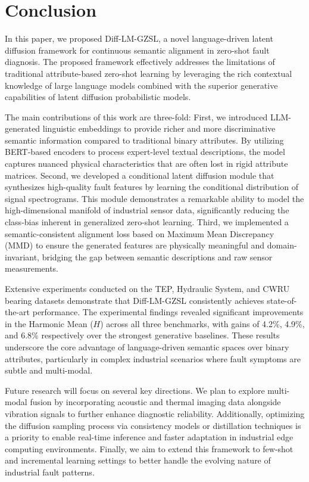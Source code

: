 \section{Conclusion}
In this paper, we proposed Diff-LM-GZSL, a novel language-driven latent diffusion framework for continuous semantic alignment in zero-shot fault diagnosis. The proposed framework effectively addresses the limitations of traditional attribute-based zero-shot learning by leveraging the rich contextual knowledge of large language models combined with the superior generative capabilities of latent diffusion probabilistic models. 

The main contributions of this work are three-fold: 
First, we introduced LLM-generated linguistic embeddings to provide richer and more discriminative semantic information compared to traditional binary attributes. By utilizing BERT-based encoders to process expert-level textual descriptions, the model captures nuanced physical characteristics that are often lost in rigid attribute matrices. 
Second, we developed a conditional latent diffusion module that synthesizes high-quality fault features by learning the conditional distribution of signal spectrograms. This module demonstrates a remarkable ability to model the high-dimensional manifold of industrial sensor data, significantly reducing the class-bias inherent in generalized zero-shot learning. 
Third, we implemented a semantic-consistent alignment loss based on Maximum Mean Discrepancy (MMD) to ensure the generated features are physically meaningful and domain-invariant, bridging the gap between semantic descriptions and raw sensor measurements.

Extensive experiments conducted on the TEP, Hydraulic System, and CWRU bearing datasets demonstrate that Diff-LM-GZSL consistently achieves state-of-the-art performance. The experimental findings revealed significant improvements in the Harmonic Mean ($H$) across all three benchmarks, with gains of 4.2\%, 4.9\%, and 6.8\% respectively over the strongest generative baselines. These results underscore the core advantage of language-driven semantic spaces over binary attributes, particularly in complex industrial scenarios where fault symptoms are subtle and multi-modal.

Future research will focus on several key directions. We plan to explore multi-modal fusion by incorporating acoustic and thermal imaging data alongside vibration signals to further enhance diagnostic reliability. Additionally, optimizing the diffusion sampling process via consistency models or distillation techniques is a priority to enable real-time inference and faster adaptation in industrial edge computing environments. Finally, we aim to extend this framework to few-shot and incremental learning settings to better handle the evolving nature of industrial fault patterns.
